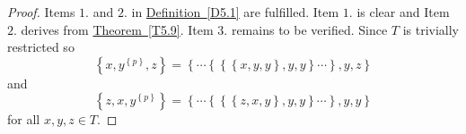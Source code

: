 \documentclass[11pt, twoside]{article}
\begin{document}
\begin{proof}
 Items $1.$ and $2.$ in \hyperref[D5.1]{Definition~\ref*{D5.1}} are fulfilled. Item $1.$ is clear and Item $2.$ derives from  \hyperref[T5.9]{Theorem~\ref*{T5.9}}. Item $3.$ remains to be verified. Since $T$ is trivially restricted so \begin{equation}\label{eq6} \left\{ x,y^{\left\{p\right\}},z\right\}=\left\{\cdots \left\{\left\{\left\{ x,y,y\right\},y,y \right\}\cdots\right\},y,z\right\} \end{equation} and \begin{equation}\label{eq7} \left\{ z,x,y^{\left\{p\right\}} \right\}=\left\{\cdots \left\{\left\{\left\{ z,x,y\right\},y,y \right\}\cdots\right\},y,y\right\} \end{equation} for all $x,y,z\in T$. 
     

\end{proof}
\end{document}
